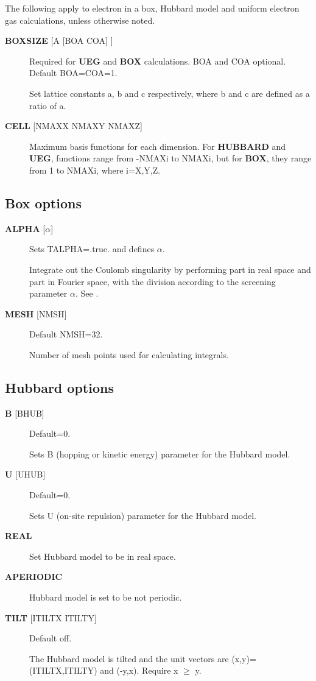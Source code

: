 \documentclass[openany,a4paper,10pt]{manual}
\begin{document}
The following apply to electron in a box, Hubbard model and uniform
electron gas calculations, unless otherwise noted.
\begin{description}
\item[\textbf{BOXSIZE} {[}A {[}BOA COA{]} {]}]
Required for \textbf{UEG} and \textbf{BOX} calculations.  BOA and COA optional. Default
BOA=COA=1.

Set lattice constants a, b and c respectively, where b and c are defined
as a ratio of a.

\item[\textbf{CELL} {[}NMAXX NMAXY NMAXZ{]}]
Maximum basis functions for each dimension.  For \textbf{HUBBARD} and \textbf{UEG},
functions range from -NMAXi to NMAXi, but for \textbf{BOX}, they range from 1
to NMAXi, where i=X,Y,Z.

\end{description}


\subsection{Box options}
\begin{description}
\item[\textbf{ALPHA} {[}$\alpha${]}]
Sets TALPHA=.true. and defines $\alpha$.

Integrate out the Coulomb singularity by performing part in real
space and part in Fourier space, with the division according to the
screening parameter $\alpha$.  See \cite{TwoElBox}.

\item[\textbf{MESH} {[}NMSH{]}]
Default NMSH=32.

Number of mesh points used for calculating integrals.

\end{description}


\subsection{Hubbard options}
\begin{description}
\item[\textbf{B} {[}BHUB{]}]
Default=0.

Sets B (hopping or kinetic energy) parameter for the Hubbard model.

\item[\textbf{U} {[}UHUB{]}]
Default=0.

Sets U (on-site repulsion) parameter for the Hubbard model.

\item[\textbf{REAL}]
Set Hubbard model to be in real space.

\item[\textbf{APERIODIC}]
Hubbard model is set to be not periodic.

\item[\textbf{TILT} {[}ITILTX ITILTY{]}]
Default off.

The Hubbard model is tilted and the unit vectors are
(x,y)=(ITILTX,ITILTY) and (-y,x).  Require x $\ge$ y.

\end{description}
\end{document}
